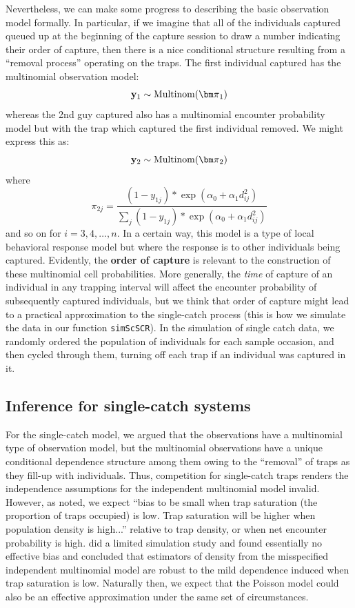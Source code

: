 Nevertheless, we can make some progress to describing the basic
observation model
formally. In particular, if we imagine that all of the individuals
captured queued up at the beginning of the capture session to draw a
number indicating their order of capture, then there is a nice conditional structure
resulting from a ``removal process'' operating on the traps.  The
first individual captured has the multinomial observation model:
\[
{\bf y}_{1} \sim \mbox{Multinom}({\bm \pi}_{1})
\]
whereas the 2nd guy captured also has a multinomial encounter
probability model but with the trap which captured the first
individual removed. We might express this as:
\[
{\bf y}_{2} \sim \mbox{Multinom}({\bm \pi}_{2})
\]
where
\[
 \pi_{2j}  = \frac{ (1-y_{1j}) * \exp( \alpha_{0} + \alpha_{1}   d_{ij}^{2}) }
{ \sum_{j} (1-y_{1j}) * \exp( \alpha_{0} + \alpha_{1}   d_{ij}^{2}) }
\]
and so on for $i=3,4,\ldots,n$.
 In a certain way, this model is a type of local behavioral
response model but where the response is to other individuals being
captured.
Evidently, the {\bf order of capture} is relevant to the
construction of these multinomial cell probabilities. More generally,
the {\it time} of capture of an individual in any trapping interval
will affect the encounter probability of subsequently captured
individuals, but we think that %
order of capture might lead to a
practical approximation to the single-catch process (this is how we
simulate the data in our function \mbox{\tt simScSCR}).
In the
simulation of single catch data, we randomly ordered the population of
individuals for each sample occasion,
and then cycled through them, turning off each trap if an individual
was captured in it.


\subsection{Inference for single-catch systems}

For the single-catch model, we argued that the observations
have a multinomial type of observation model, but the
multinomial observations have a unique conditional dependence
structure among them owing to the ``removal'' of traps as they fill-up
with individuals.
Thus,
competition for single-catch traps renders the independence
assumptions for the independent multinomial model invalid.  However, as
\citet{efford_etal:2009euring} noted, we expect ``bias to be small
when trap saturation (the proportion of traps occupied) is low.  Trap
saturation will be higher when population density is high...''
relative to trap density, or when net encounter probability is high.
\citet{efford_etal:2009euring} did a limited simulation study and found essentially no
effective bias and concluded that estimators of density from the
misspecified independent multinomial model are robust to the mild
dependence induced when trap saturation is low.  Naturally then, we
expect that the
Poisson model could also be an effective approximation under the same set
of circumstances.

